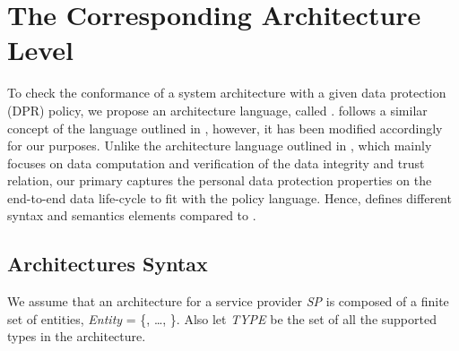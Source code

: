 \documentclass[a4paper]{article}
\begin{document}
\section{The Corresponding Architecture Level}
\label{sec:arch0}

To check the conformance of a system architecture with a given data protection (DPR) policy, we propose an architecture language, called  .  follows a similar concept of the language outlined in \cite{TaAntignac14}, however, it has been modified accordingly for our purposes. Unlike the architecture language outlined in \cite{Antignac14, TaAntignac14}, which mainly focuses on data computation and verification of the data integrity and trust relation, our  primary captures the personal data protection properties on the end-to-end data life-cycle to fit with the policy language. Hence,  defines different syntax and semantics elements compared to \cite{TaAntignac14, Antignac14}.  

\subsection{Architectures Syntax}
\label{sec:syntax0}

We assume that an architecture for a service provider \textit{SP} is composed of a finite set of entities, \textit{Entity} = \{, \dots, \}.  Also let \textit{TYPE} be the set of all the supported types in the architecture.    
\end{document}
